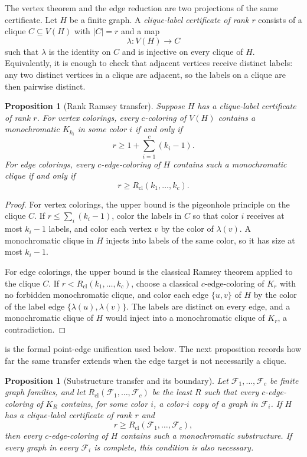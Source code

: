 \documentclass[11pt]{article}
\theoremstyle{plain}
\newtheorem{proposition}[theorem]{Proposition}
\theoremstyle{definition}
\theoremstyle{remark}
\newcommand{\Rcl}{R_{\mathrm{cl}}}
\begin{document}
The vertex theorem and the edge reduction are two projections of the same
certificate.  Let $H$ be a finite graph.  A \emph{clique-label certificate of
rank $r$} consists of a clique $C\subseteq V(H)$ with $|C|=r$ and a map
\[
  \lambda:V(H)\to C
\]
such that $\lambda$ is the identity on $C$ and is injective on every clique of
$H$.  Equivalently, it is enough to check that adjacent vertices receive
distinct labels: any two distinct vertices in a clique are adjacent, so the
labels on a clique are then pairwise distinct.

\begin{proposition}[Rank Ramsey transfer]
\label{prop:rank-transfer}
Suppose $H$ has a clique-label certificate of rank $r$.  For vertex colorings,
every $c$-coloring of $V(H)$ contains a monochromatic $K_{k_i}$ in some color
$i$ if and only if
\[
  r\ge 1+\sum_{i=1}^c(k_i-1).
\]
For edge colorings, every $c$-edge-coloring of $H$ contains such a
monochromatic clique if and only if
\[
  r\ge \Rcl(k_1,\ldots,k_c).
\]
\end{proposition}

\begin{proof}
For vertex colorings, the upper bound is the pigeonhole principle on the
clique $C$.  If $r\le \sum_i(k_i-1)$, color the labels in $C$ so that color
$i$ receives at most $k_i-1$ labels, and color each vertex $v$ by the color of
$\lambda(v)$.  A monochromatic clique in $H$ injects into labels of the same
color, so it has size at most $k_i-1$.

For edge colorings, the upper bound is the classical Ramsey theorem applied to
the clique $C$.  If $r<\Rcl(k_1,\ldots,k_c)$, choose a classical
$c$-edge-coloring of $K_r$ with no forbidden monochromatic clique, and color
each edge $\{u,v\}$ of $H$ by the color of the label edge
$\{\lambda(u),\lambda(v)\}$.  The labels are distinct on every edge, and a
monochromatic clique of $H$ would inject into a monochromatic clique of
$K_r$, a contradiction.
\end{proof}

 is the formal point-edge unification used below.
The next proposition records how far the same transfer extends when the edge
target is not necessarily a clique.

\begin{proposition}[Substructure transfer and its boundary]
\label{prop:substructure-transfer}
Let $\mathcal F_1,\ldots,\mathcal F_c$ be finite graph families, and let
$R_{\mathrm{cl}}(\mathcal F_1,\ldots,\mathcal F_c)$ be the least $R$ such
that every $c$-edge-coloring of $K_R$ contains, for some color $i$, a
color-$i$ copy of a graph in $\mathcal F_i$.  If $H$ has a clique-label
certificate of rank $r$ and
\[
  r\ge R_{\mathrm{cl}}(\mathcal F_1,\ldots,\mathcal F_c),
\]
then every $c$-edge-coloring of $H$ contains such a monochromatic
substructure.  If every graph in every $\mathcal F_i$ is complete, this
condition is also necessary.
\end{proposition}
\end{document}

